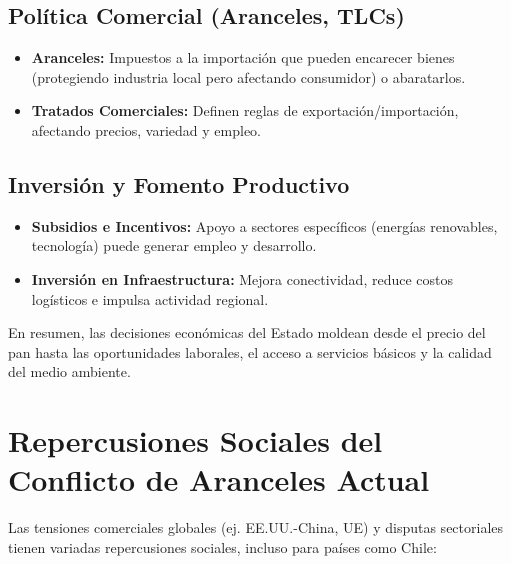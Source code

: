 \documentclass[12pt, a4paper]{article}
\begin{document}
\subsection{Política Comercial (Aranceles, TLCs)}
\begin{itemize}
    \item \textbf{Aranceles:} Impuestos a la importación que pueden encarecer bienes (protegiendo industria local pero afectando consumidor) o abaratarlos.
    \item \textbf{Tratados Comerciales:} Definen reglas de exportación/importación, afectando precios, variedad y empleo.
\end{itemize}

\subsection{Inversión y Fomento Productivo}
\begin{itemize}
    \item \textbf{Subsidios e Incentivos:} Apoyo a sectores específicos (energías renovables, tecnología) puede generar empleo y desarrollo.
    \item \textbf{Inversión en Infraestructura:} Mejora conectividad, reduce costos logísticos e impulsa actividad regional.
\end{itemize}

En resumen, las decisiones económicas del Estado moldean desde el precio del pan hasta las oportunidades laborales, el acceso a servicios básicos y la calidad del medio ambiente.

\section{Repercusiones Sociales del Conflicto de Aranceles Actual}

Las tensiones comerciales globales (ej. EE.UU.-China, UE) y disputas sectoriales tienen variadas repercusiones sociales, incluso para países como Chile:
\end{document}
